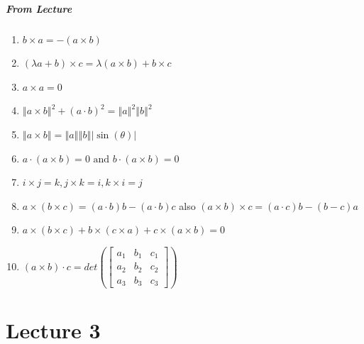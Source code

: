 \documentclass[11pt]{book}
\begin{document}
\paragraph{From Lecture} 
\begin{enumerate}
    \item $b\times a =  - \left( a\times b \right) $ 
    \item $\left( \lambda a + b \right) \times c = \lambda \left( a\times b \right)  + b\times c$ 
    \item $a\times a = 0$ 
    \item $\left\Vert a\times b \right\Vert^2  + \left( a \cdot b \right) ^2 = \left\Vert a \right\Vert ^2 \left\Vert b \right\Vert ^2 $ 
    \item $\left\Vert a\times b \right\Vert = \left\Vert a \right\Vert \left\Vert b \right\Vert \left| \sin  \left( \theta \right)  \right| $ 
    \item $a \cdot \left( a\times b \right) = 0 \text{ and } b \cdot \left( a\times b \right) = 0$ 
    \item $i\times j= k, j\times k= i, k\times i= j$ 
    \item $a\times \left( b\times c \right) = \left( a \cdot b \right) b - \left( a \cdot b \right) c$ also $\left( a\times b \right) \times c = \left( a \cdot c \right) b  -  \left( b - c \right) a$ 
    \item $a\times \left( b\times c \right)  + b\times \left( c\times a \right)  + c \times \left( a\times b \right) = 0$ 
    \item $\left( a\times b \right)  \cdot c = \mathit{det} \left(
            \begin{bmatrix}
            	a_{1}  &b_{1}   & c_{1}  \\
            	a_{2}  &b_{2}   & c_{2}  \\
            	a_{3}  &b_{3}   & c_{3}  
            \end{bmatrix}
        \right) $ 
\end{enumerate}





\chapter{Lecture 3}%
\label{chp:lecture_3}
\end{document}
